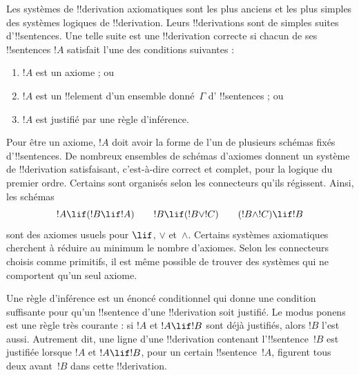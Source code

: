 \documentclass[../../../include/open-logic-section]{subfiles}
\begin{document}
      {}
      {}


Les systèmes de !!{derivation} axiomatiques sont les plus anciens et
les plus simples des systèmes logiques de !!{derivation}. Leurs
!!{derivation}s sont de simples suites d'!!{sentence}s. Une telle
suite est une !!{derivation} correcte si chacun de ses !!{sentence}s
$!A$ satisfait l'une des conditions suivantes :
\begin{enumerate}
\item $!A$ est un axiome ; ou
\item $!A$ est un !!{element} d'un ensemble donné~$\Gamma$ d'%
  !!{sentence}s ; ou
\item $!A$ est justifié par une règle d'inférence.
\end{enumerate}
Pour être un axiome, $!A$ doit avoir la forme de l'un de plusieurs
schémas fixés d'!!{sentence}s. De nombreux ensembles de schémas
d'axiomes donnent un système de !!{derivation} satisfaisant, c'est-à-dire
correct et complet, pour la logique du premier ordre. Certains sont
organisés selon les connecteurs qu'ils régissent. Ainsi, les schémas
\[
!A \lif (!B \lif !A) \qquad !B \lif (!B \lor !C) \qquad (!B \land !C) \lif !B
\]
sont des axiomes usuels pour $\lif$, $\lor$ et~$\land$.
Certains systèmes axiomatiques cherchent à réduire au minimum le nombre
d'axiomes. Selon les connecteurs choisis comme primitifs, il est même
possible de trouver des systèmes qui ne comportent qu'un seul axiome.

Une règle d'inférence est un énoncé conditionnel qui donne une condition
suffisante pour qu'un !!{sentence} d'une !!{derivation} soit justifié.
Le modus ponens est une règle très courante : si $!A$ et $!A \lif !B$
sont déjà justifiés, alors $!B$ l'est aussi. Autrement dit, une ligne
d'une !!{derivation} contenant l'!!{sentence}~$!B$ est justifiée
lorsque $!A$ et $!A \lif !B$, pour un certain !!{sentence}~$!A$,
figurent tous deux avant~$!B$ dans cette !!{derivation}.
\end{document}
